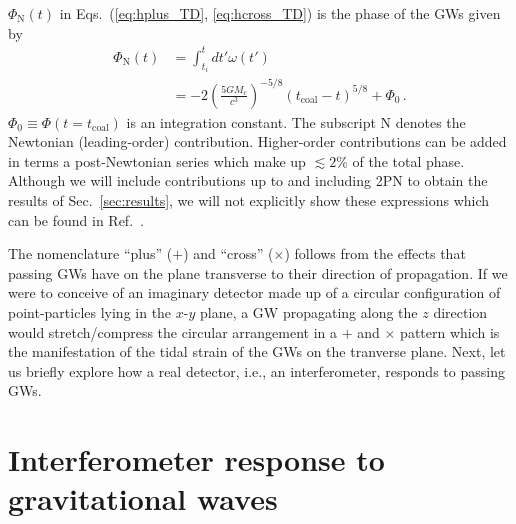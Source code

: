 \documentclass[amsmath,amssymb,aps,floats,amsfonts,notitlepage,superscriptaddress,eqsecnum,nofootinbib,10pt]{revtex4-1}
\newcommand{\nn}{\nonumber}
\newcommand{\f}{\frac}
\begin{document}
$\Phi_\text{N}(t)$ in Eqs.~(\ref{eq:hplus_TD}, \ref{eq:hcross_TD}) is the phase of the GWs given by
%
\begin{align}
\Phi_\text{N}(t) &=\int_{t_i}^t dt' \omega(t') \nn\\
&= -2\left(\f{5 G M_c}{c^3}\right)^{-5/8} (t_\text{coal}-t)^{5/8}+ \Phi_0 \, .\label{eq:Phase}
\end{align}
%
$\Phi_0 \equiv \Phi(t=t_\text{coal})$ is an integration constant. The subscript N denotes the Newtonian (leading-order) contribution. 
Higher-order contributions can be added in terms a post-Newtonian series which make up $\lesssim 2\%$ of the total phase.
Although we will include contributions up to and including 2PN to obtain the results of Sec.~\ref{sec:results}, we will not explicitly show these expressions 
which can be found in Ref.~\cite{Blanchet_LRR}.

The nomenclature ``plus'' ($+$) and ``cross'' ($\times$) follows from the effects that passing GWs have on the plane transverse to their direction of propagation.
If we were to conceive of an imaginary detector made up of a circular configuration of point-particles lying in the $x$-$y$ plane, a GW propagating along the $z$ direction would stretch/compress the circular arrangement in a $+$ and $\times$ pattern which is the manifestation of the tidal strain of the GWs on the tranverse plane.
Next, let us briefly explore how a real detector, i.e., an interferometer, responds to passing GWs.


\section{Interferometer response to gravitational waves}\label{sec:IFO_response}
\end{document}
